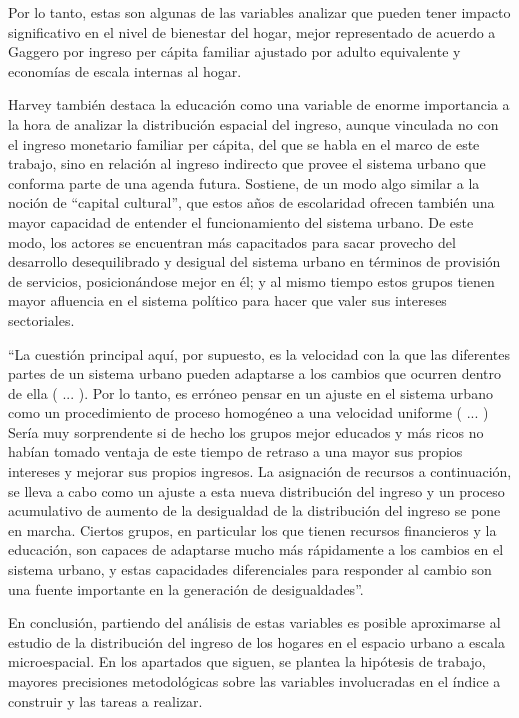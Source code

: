 	Por lo tanto, estas son algunas de las variables analizar que pueden tener impacto significativo en el nivel de bienestar del hogar, mejor representado de acuerdo a Gaggero \cite{gaggero} por ingreso per cápita familiar ajustado por adulto equivalente y economías de escala internas al hogar.
	
	Harvey también destaca la educación como una variable de enorme importancia a la hora de analizar la distribución espacial del ingreso, aunque vinculada no con el ingreso monetario familiar per cápita, del que se habla en el marco de este trabajo, sino en relación al ingreso indirecto que provee el sistema urbano que conforma parte de una agenda futura. Sostiene, de un modo algo similar a la noción de “capital cultural”, que estos años de escolaridad ofrecen también una mayor capacidad de entender el funcionamiento del sistema urbano. De este modo, los actores se encuentran más capacitados para sacar provecho del desarrollo desequilibrado y desigual del sistema urbano en términos de provisión de servicios, posicionándose mejor en él; y al mismo tiempo estos grupos tienen mayor afluencia en el sistema político para hacer que valer sus intereses sectoriales.
	
	“La cuestión principal aquí, por supuesto, es la velocidad con la que las diferentes partes de un sistema urbano pueden adaptarse a los cambios que ocurren dentro de ella ( ... ). Por lo tanto, es erróneo pensar en un ajuste en el sistema urbano como un procedimiento de proceso homogéneo a una velocidad uniforme ( ... ) Sería muy sorprendente si de hecho los grupos mejor educados y más ricos no habían tomado ventaja de este tiempo de retraso a una mayor sus propios intereses y mejorar sus propios ingresos. La asignación de recursos a continuación, se lleva a cabo como un ajuste a esta nueva distribución del ingreso y un proceso acumulativo de aumento de la desigualdad de la distribución del ingreso se pone en marcha. Ciertos grupos, en particular los que tienen recursos financieros y la educación, son capaces de adaptarse mucho más rápidamente a los cambios en el sistema urbano, y estas capacidades diferenciales para responder al cambio son una fuente importante en la generación de desigualdades”\cite[p.~56]{Harvey}.
	
	En conclusión, partiendo del análisis de estas variables es posible aproximarse al estudio de la distribución del ingreso de los hogares en el espacio urbano a escala microespacial. En los apartados que siguen, se plantea la hipótesis de trabajo, mayores precisiones metodológicas sobre las variables involucradas en el índice a construir y las tareas a realizar.
	
